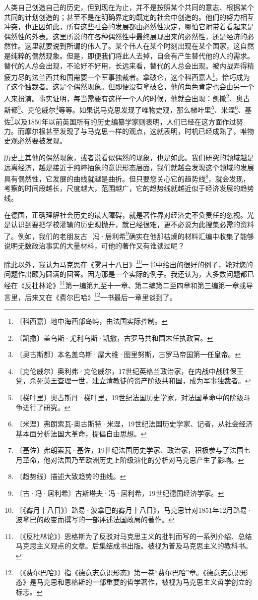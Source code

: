 \documentclass[12pt,UTF-8,openany]{ctexbook}
\begin{document}
\begin{normalsize}
    人类自己创造自己的历史，但到现在为止，并不是按照某个共同的意志、根据某个共同的计划创造的；甚至不是在明确界定的既定的社会中创造的。他们的努力相互冲突，也正因如此，所有这些社会的发展都由必然性决定，哪怕它附带着看起来是偶然性的外表。这里所说的在各种偶然性中最终展现出来的必然性，还是经济的必然性。这里就要说到所谓的伟人了。某个伟人在某个时刻出现在某个国家，这自然是纯粹的偶然现象。但是，即便我们将此人去掉，自会有产生替代他的人的需求。替代的人总会出现，不论好不好用，长远来看，替代的人总会出现。被内战弄得精疲力尽的法兰西共和国需要一个军事独裁者。拿破仑，这个科西嘉人\footnote{〔科西嘉〕地中海西部岛屿，由法国实际控制。}，恰巧成为了这个独裁者。这是个偶然现象。但即便没有拿破仑，他的角色肯定也会由另一个人来扮演。事实证明，每当需要有这样一个人的时候，他就会出现：凯撒\footnote{〔凯撒〕盖乌斯·尤利乌斯·凯撒，古罗马共和国末任执政官。}、奥古斯都\footnote{〔奥古斯都〕本名盖乌斯·屋大维·图里努斯，古罗马帝国第一任皇帝。}、克伦威尔\footnote{〔克伦威尔〕奥利弗·克伦威尔，17世纪英格兰政治家，在内战中战胜保王党，杀死英王查理一世，建立清教徒的资产阶级共和国，成为军事独裁者。}等等。如果说马克思发现了唯物史观，那么梯叶里\footnote{〔梯叶里〕奥古斯丹·梯叶里，19世纪法国历史学家，对法国革命中的阶级斗争进行了研究。}、米涅\footnote{〔米涅〕弗朗索瓦-奥古斯特·米涅，19世纪法国历史学家、记者，从社会经济基本面分析法国大革命，提倡自由思想。}、基佐\footnote{〔基佐〕弗朗索瓦·基佐，19世纪法国历史学家、政治家，积极参与了法国七月革命，他对法国乃至欧洲历史上阶级演化的分析对马克思产生了影响。}以及1850年以前英国所有的历史编纂学家则表明，人们已经在这方面作过努力。而摩尔根甚至发现了与马克思一样的观点，这就表明，时机已经成熟了，唯物史观必然要被发现。
    
    历史上其他的偶然现象，或者说看似偶然的现象，也是如此。我们研究的领域越是远离经济，越是接近于纯粹抽象的意识形态层面，我们就越会发现这个领域的发展具有偶然性，它发展的曲线就越是曲折。但只要您关心它的趋势线\footnote{〔趋势线〕描述大致趋势的曲线。}，就会发现，考察的时间段越长，尺度越大，范围越广，它的趋势线就越近似于经济发展的趋势线。
    
    在德国，正确理解社会历史的最大障碍，就是著作界对经济史不负责任的忽视。光是认识到要把学校灌输的历史观抛开，就已经很难，更不必说为此搜集必需的资料了。例如，我们的老朋友古·冯·居利希\footnote{〔古·冯·居利希〕古斯塔夫·冯·居利希，19世纪德国经济学家。}确实在他那枯燥的材料汇编中收集了能够说明无数政治事实的大量材料，可他的著作又有谁读过呢？
    
    除此以外，我认为马克思在《雾月十八日》\footnote{〔《雾月十八日》〕路易·波拿巴的雾月十八日》，马克思针对1851年12月路易·波拿巴的政变而撰写的一部评述法国政局的著作。}一书中给出的很好的例子，能对您的问题作出颇为圆满的回答。因为那是一个实际的例子。我还认为，大多数问题都已经在《反杜林论》\footnote{〔《反杜林论》〕恩格斯为了反驳对马克思主义的批判而写的一系列介绍、总结马克思主义观点的文章。后集结成书出版。被视为普及马克思主义的教科书。}第一编第九至十一章、第二编第二至四章和第三编第一章或导言里，后来又在《费尔巴哈》\footnote{〔《费尔巴哈》〕指《德意志意识形态》第一卷“费尔巴哈”章。《德意志意识形态》是马克思和恩格斯的一部重要的哲学著作，被视为马克思主义哲学创立的标志。}一书最后一章里谈到了。
    

\end{normalsize}
\end{document}
